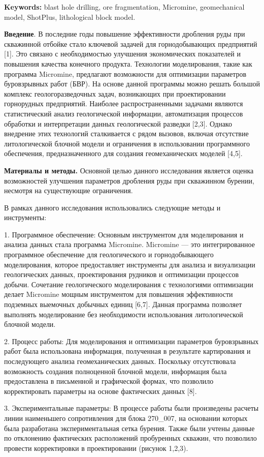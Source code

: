 {\bfseries Keywords:} blast hole drilling, ore fragmentation, Micromine,
geomechanical model, ShotPlus, lithological block model.
\begin{multicols}{2}

{\bfseries Введение}. В последние годы повышение эффективности дробления
руды при скважинной отбойке стало ключевой задачей для горнодобывающих
предприятий {[}1{]}. Это связано с необходимостью улучшения
экономических показателей и повышения качества конечного продукта.
Технологии моделирования, такие как программа Micromine, предлагают
возможности для оптимизации параметров буровзрывных работ (БВР). На
основе данной программы можно решать большой комплекс геологоразведочных
задач, возникающих при проектировании горнорудных предприятий. Наиболее
распространенными задачами являются статистический анализ геологической
информации, автоматизация процессов обработки и интерпретации данных
геологической разведки {[}2,3{]}. Однако внедрение этих технологий
сталкивается с рядом вызовов, включая отсутствие литологической блочной
модели и ограничения в использовании программного обеспечения,
предназначенного для создания геомеханических моделей {[}4,5{]}.

{\bfseries Материалы и методы.} Основной целью данного исследования
является оценка возможностей улучшения параметров дробления руды при
скважинном бурении, несмотря на существующие ограничения.

В рамках данного исследования использовались следующие методы и
инструменты:

1. Программное обеспечение: Основным инструментом для моделирования и
анализа данных стала программа Micromine. Micromine --- это
интегрированное программное обеспечение для геологического и
горнодобывающего моделирования, которое предоставляет инструменты для
анализа и визуализации геологических данных, проектирования рудников и
оптимизации процессов добычи. Сочетание геологического моделирования с
технологиями оптимизации делает Micromine мощным инструментом для
повышения эффективности подземных выемочных добычных единиц {[}6,7{]}.
Данная программа позволяет выполнять моделирование без необходимости
использования литологической блочной модели.

2. Процесс работы: Для моделирования и оптимизации параметров
буровзрывных работ была использована информация, полученная в результате
картирования и последующего анализа геомеханических данных. Поскольку
отсутствовала возможность создания полноценной блочной модели,
информация была предоставлена в письменной и графической формах, что
позволило корректировать параметры на основе фактических данных {[}8{]}.

3. Экспериментальные параметры: В процессе работы были произведены
расчеты линии наименьшего сопротивления для блока 270\_007, на основании
которых была разработана экспериментальная сетка бурения. Также были
учтены данные по отклонению фактических расположений пробуренных
скважин, что позволило провести корректировки в проектировании (рисунок
1,2,3).
\end{multicols}

